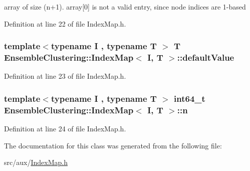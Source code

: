 array of size (n+1). array\mbox{[}0\mbox{]} is not a valid entry, since node indices are 1-\/based 



Definition at line 22 of file Index\-Map.\-h.

\hypertarget{class_ensemble_clustering_1_1_index_map_ab5f1dc778237131e9d6c5713c2b318ec}{
\subsubsection[{default\-Value}]{\setlength{\rightskip}{0pt plus 5cm}template$<$typename I , typename T $>$ T {\bf Ensemble\-Clustering\-::\-Index\-Map}$<$ I, T $>$\-::default\-Value\hspace{0.3cm}{\ttfamily [protected]}}}\label{class_ensemble_clustering_1_1_index_map_ab5f1dc778237131e9d6c5713c2b318ec}


Definition at line 23 of file Index\-Map.\-h.

\hypertarget{class_ensemble_clustering_1_1_index_map_a3151d302c54e6ad0175bd87aef62d4ca}{
\subsubsection[{n}]{\setlength{\rightskip}{0pt plus 5cm}template$<$typename I , typename T $>$ int64\-\_\-t {\bf Ensemble\-Clustering\-::\-Index\-Map}$<$ I, T $>$\-::n\hspace{0.3cm}{\ttfamily [protected]}}}\label{class_ensemble_clustering_1_1_index_map_a3151d302c54e6ad0175bd87aef62d4ca}


Definition at line 24 of file Index\-Map.\-h.



The documentation for this class was generated from the following file\-:\begin{DoxyCompactItemize}
\item 
src/aux/\hyperlink{_index_map_8h}{Index\-Map.\-h}\end{DoxyCompactItemize}
